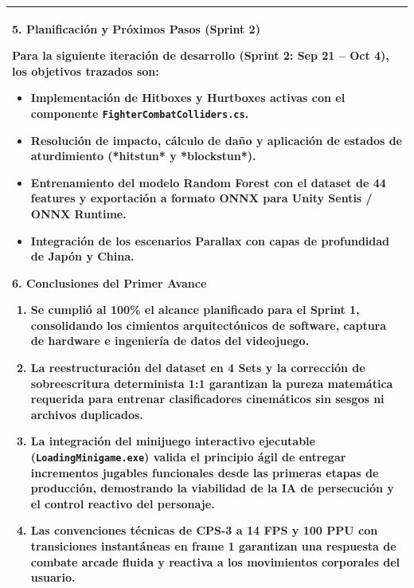 \documentclass[10pt,a4paper]{article}
\begin{document}
{\begin{tabularx}{\textwidth}{|X|}
{    \vspace{0.25cm}
    \raggedright\textbf{\large 5. Planificación y Próximos Pasos (Sprint 2)}\par\vspace{0.15cm}
    Para la siguiente iteración de desarrollo (Sprint 2: Sep 21 -- Oct 4), los objetivos trazados son:
    \begin{itemize}[noitemsep,topsep=2pt]
        \item Implementación de Hitboxes y Hurtboxes activas con el componente \texttt{FighterCombatColliders.cs}.
        \item Resolución de impacto, cálculo de daño y aplicación de estados de aturdimiento (*hitstun* y *blockstun*).
        \item Entrenamiento del modelo Random Forest con el dataset de 44 features y exportación a formato ONNX para Unity Sentis / ONNX Runtime.
        \item Integración de los escenarios Parallax con capas de profundidad de Japón y China.
    \end{itemize}

    \vspace{0.25cm}
    \raggedright\textbf{\large 6. Conclusiones del Primer Avance}\par\vspace{0.15cm}
    \begin{enumerate}[noitemsep,topsep=2pt]
        \item Se cumplió al 100\% el alcance planificado para el Sprint 1, consolidando los cimientos arquitectónicos de software, captura de hardware e ingeniería de datos del videojuego.
        \item La reestructuración del dataset en 4 Sets y la corrección de sobreescritura determinista 1:1 garantizan la pureza matemática requerida para entrenar clasificadores cinemáticos sin sesgos ni archivos duplicados.
        \item La integración del minijuego interactivo ejecutable (\texttt{LoadingMinigame.exe}) valida el principio ágil de entregar incrementos jugables funcionales desde las primeras etapas de producción, demostrando la viabilidad de la IA de persecución y el control reactivo del personaje.
        \item Las convenciones técnicas de CPS-3 a 14 FPS y 100 PPU con transiciones instantáneas en frame 1 garantizan una respuesta de combate arcade fluida y reactiva a los movimientos corporales del usuario.
    \end{enumerate}
} \tabularnewline
\hline
\end{tabularx}
}
\end{document}
